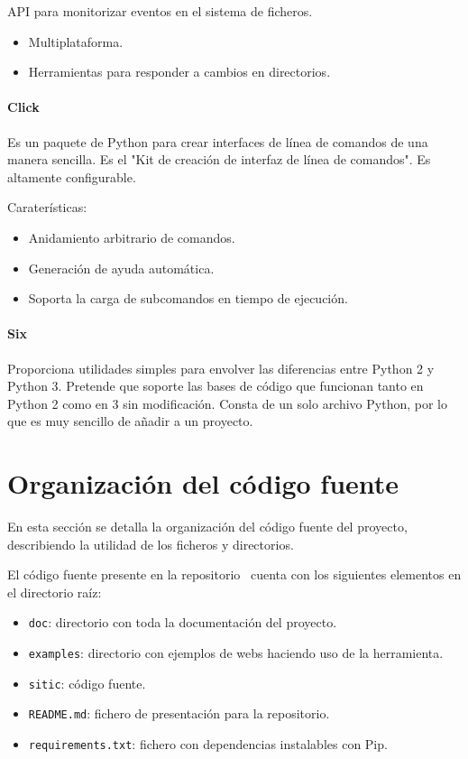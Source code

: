 API para monitorizar eventos en el sistema de ficheros.

\begin{itemize}
    \item Multiplataforma.
    \item Herramientas para responder a cambios en directorios.
\end{itemize}

\paragraph{Click}

Es un paquete de Python para crear interfaces de línea de comandos de una manera
sencilla. Es el "Kit de creación de interfaz de
línea de comandos". Es altamente configurable.

Caraterísticas:

\begin{itemize}
    \item Anidamiento arbitrario de comandos.
    \item Generación de ayuda automática.
    \item Soporta la carga de subcomandos en tiempo de ejecución.
\end{itemize}

\paragraph{Six}

Proporciona utilidades simples para envolver las diferencias entre Python 2 y Python 3. Pretende
que soporte las bases de código que funcionan tanto en Python 2 como en 3 sin modificación.
Consta de un solo archivo Python, por lo que es muy sencillo de añadir a un proyecto.


\section{Organización del código fuente}

En esta sección se detalla la organización del código fuente del proyecto,
describiendo la utilidad de los ficheros y directorios.

El código fuente presente en la repositorio~\cite{repo} cuenta con los siguientes
elementos en el directorio raíz:

\begin{itemize}
    \item \texttt{doc}: directorio con toda la documentación del proyecto.
    \item \texttt{examples}: directorio con ejemplos de webs haciendo uso de la herramienta.
    \item \texttt{sitic}: código fuente.
    \item \texttt{README.md}: fichero de presentación para la repositorio.
    \item \texttt{requirements.txt}: fichero con dependencias instalables con Pip.
\end{itemize}

